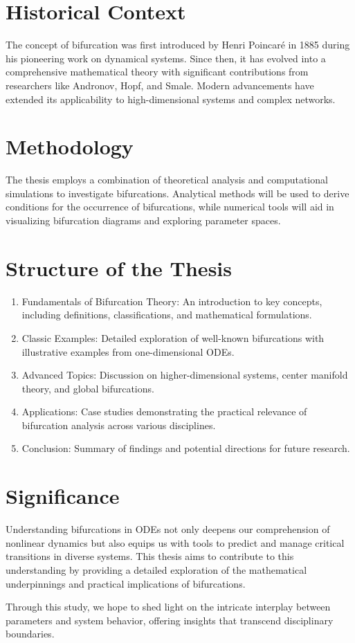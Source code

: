 \section{Historical Context}

The concept of bifurcation was first introduced by Henri Poincaré in 1885 during his pioneering work on dynamical systems. Since then, it has evolved into a comprehensive mathematical theory with significant contributions from researchers like Andronov, Hopf, and Smale. Modern advancements have extended its applicability to high-dimensional systems and complex networks.

\section{Methodology}

The thesis employs a combination of theoretical analysis and computational simulations to investigate bifurcations. Analytical methods will be used to derive conditions for the occurrence of bifurcations, while numerical tools will aid in visualizing bifurcation diagrams and exploring parameter spaces.

\section{Structure of the Thesis}
\begin{enumerate}
\item Fundamentals of Bifurcation Theory: An introduction to key concepts, including definitions, classifications, and mathematical formulations.
\item Classic Examples: Detailed exploration of well-known bifurcations with illustrative examples from one-dimensional ODEs.
\item Advanced Topics: Discussion on higher-dimensional systems, center manifold theory, and global bifurcations.
\item Applications: Case studies demonstrating the practical relevance of bifurcation analysis across various disciplines.
\item Conclusion: Summary of findings and potential directions for future research.
\end{enumerate}


\section{Significance}

Understanding bifurcations in ODEs not only deepens our comprehension of nonlinear dynamics but also equips us with tools to predict and manage critical transitions in diverse systems. This thesis aims to contribute to this understanding by providing a detailed exploration of the mathematical underpinnings and practical implications of bifurcations.

Through this study, we hope to shed light on the intricate interplay between parameters and system behavior, offering insights that transcend disciplinary boundaries.
